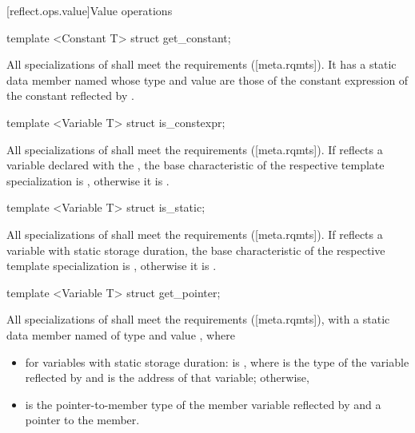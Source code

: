 [reflect.ops.value]{Value operations}

\begin{std.txt}\color{addclr}

\begin{itemdecl}
template <Constant T> struct get_constant;
\end{itemdecl}

\begin{itemdescr}
\pnum
All specializations of  shall meet the  requirements ([meta.rqmts]). It has a static data member named  whose type and value are those of the constant expression of the constant reflected by .

\end{itemdescr}

\begin{itemdecl}
template <Variable T> struct is_constexpr;
\end{itemdecl}

\begin{itemdescr}
\pnum
All specializations of  shall meet the  requirements ([meta.rqmts]). If  reflects a variable declared with the  , the base characteristic of the respective template specialization is , otherwise it is .
\end{itemdescr}

\begin{itemdecl}
template <Variable T> struct is_static;
\end{itemdecl}

\begin{itemdescr}
\pnum
All specializations of  shall meet the  requirements ([meta.rqmts]). If  reflects a variable with static storage duration, the base characteristic of the respective template specialization is , otherwise it is .
\end{itemdescr}

\begin{itemdecl}
template <Variable T> struct get_pointer;
\end{itemdecl}

\begin{itemdescr}
\pnum
All specializations of  shall meet the  requirements ([meta.rqmts]), with a static data member named  of type  and value , where
\begin{itemize}
  \item for variables with static storage duration:  is , where  is the type of the variable reflected by  and  is the address of that variable; otherwise,
  \item {} is the pointer-to-member type of the member variable reflected by  and  a pointer to the member.
\end{itemize}
\end{itemdescr}
\end{std.txt}

